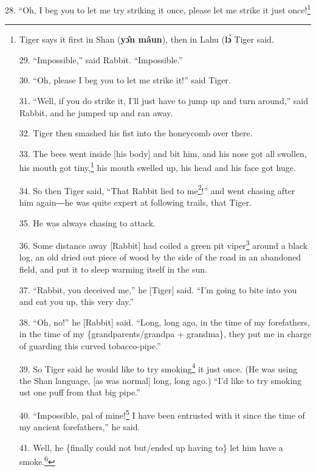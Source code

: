 28. ``Oh, I beg you to let me try striking it once, please let me strike it just
once!\footnote{Tiger says it first in Shan (\textbf{yɔ̂n mâun}), then in Lahu (\textbf{lɔ̀} Tiger said.

29. ``Impossible,'' said Rabbit. ``Impossible.''

30. ``Oh, please I beg you to let me strike it!'' said Tiger.

31. ``Well, if you do strike it, I'll just have to jump up and turn around,'' said
Rabbit, and he jumped up and ran away.

32. Tiger then smashed his fist into the honeycomb over there.

33. The bees went inside [his body] and bit him, and his nose got all swollen,
his mouth got tiny,\footnote{Because of the stings around his mouth, his oral orifice was almost completely} his mouth swelled up, his head and his face got huge.

34. So then Tiger said, ``That Rabbit lied to me\footnote{Lit. ``lies to people,'' but the non-3\textsuperscript{rd} person benefactive}!'' and went chasing after
him again―he was quite expert at following trails, that Tiger.

35. He was always chasing to attack.

36. Some distance away [Rabbit] had coiled a green pit viper\footnote{\textbf{ vɨ̀-nɔ }\textit{Trimeresurus popeorum}. Only slightly venomous,} around a black
log, an old dried out piece of wood by the side of the road in an abandoned field,
and put it to sleep warming itself in the sun.

37. ``Rabbit, you deceived me,'' he [Tiger] said. ``I'm going to bite into you
and eat you up, this very day.''

38. ``Oh, no!'' he [Rabbit] said. ``Long, long ago, in the time of my forefathers,
in the time of my \{grandparents/grandpa + grandma\}, they put me in charge of
guarding this curved tobacco-pipe.''

39. So Tiger said he would like to try smoking\footnote{He uses a Lahuized Shan loanword \textbf{lùʔ} for `smoke'.} it just once. (He was using
the Shan language, [as was normal] long, long ago.) ``I'd like to try smoking ust
one puff from that big pipe.''

40. ``Impossible, pal of mine!\footnote{Rabbit uses the friendly Shan-derived word \textbf{šahÁy} `buddy; pal',} I have been entrusted with it since the time
of my ancient forefathers,'' he said.

41. Well, he \{finally could not but/ended up having to\} let him have a smoke.\footnote{\textbf{ tɔ}: causative of \textbf{dɔ̀ }`drink; smoke (tobacco)', like}

}
